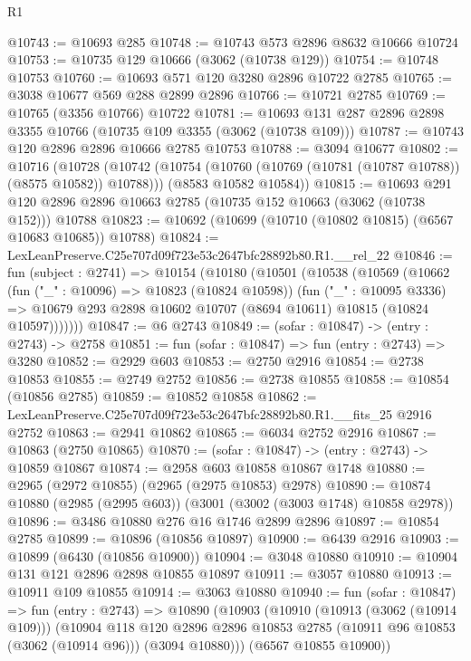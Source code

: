 \begin{lexlean}{R1}
\begin{coremodule}
@10743 := @10693 @285
@10748 := @10743 @573 @2896 @8632 @10666 @10724
@10753 := @10735 @129 @10666 (@3062 (@10738 @129))
@10754 := @10748 @10753
@10760 := @10693 @571 @120 @3280 @2896 @10722 @2785
@10765 := @3038 @10677 @569 @288 @2899 @2896
@10766 := @10721 @2785
@10769 := @10765 (@3356 @10766) @10722
@10781 := @10693 @131 @287 @2896 @2898 @3355 @10766 (@10735 @109 @3355 (@3062 (@10738 @109)))
@10787 := @10743 @120 @2896 @2896 @10666 @2785 @10753
@10788 := @3094 @10677
@10802 := @10716
    (@10728
      (@10742 (@10754 (@10760 (@10769 (@10781 (@10787 @10788)) (@8575 @10582)) @10788)))
      (@8583 @10582 @10584))
@10815 := @10693
    @291
    @120
    @2896
    @2896
    @10663
    @2785
    (@10735 @152 @10663 (@3062 (@10738 @152)))
    @10788
@10823 := @10692 (@10699 (@10710 (@10802 @10815) (@6567 @10683 @10685)) @10788)
@10824 := LexLeanPreserve.C25e707d09f723e53c2647bfc28892b80.R1.__rel_22
@10846 := fun (subject : @2741) =>
  @10154
    (@10180
      (@10501
        (@10538
          (@10569
            (@10662
              (fun ("_" : @10096) => @10823 (@10824 @10598))
              (fun ("_" : @10095 @3336) =>
              @10679 @293 @2898 @10602 @10707 (@8694 @10611) @10815 (@10824 @10597)))))))
@10847 := @6 @2743
@10849 := (sofar : @10847) -> (entry : @2743) -> @2758
@10851 := fun (sofar : @10847) => fun (entry : @2743) => @3280
@10852 := @2929 @603
@10853 := @2750 @2916
@10854 := @2738 @10853
@10855 := @2749 @2752
@10856 := @2738 @10855
@10858 := @10854 (@10856 @2785)
@10859 := @10852 @10858
@10862 := LexLeanPreserve.C25e707d09f723e53c2647bfc28892b80.R1.__fits_25 @2916 @2752
@10863 := @2941 @10862
@10865 := @6034 @2752 @2916
@10867 := @10863 (@2750 @10865)
@10870 := (sofar : @10847) -> (entry : @2743) -> @10859 @10867
@10874 := @2958 @603 @10858 @10867 @1748
@10880 := @2965 (@2972 @10855) (@2965 (@2975 @10853) @2978)
@10890 := @10874 @10880 (@2985 (@2995 @603)) (@3001 (@3002 (@3003 @1748) @10858 @2978))
@10896 := @3486 @10880 @276 @16 @1746 @2899 @2896
@10897 := @10854 @2785
@10899 := @10896 (@10856 @10897)
@10900 := @6439 @2916
@10903 := @10899 (@6430 (@10856 @10900))
@10904 := @3048 @10880
@10910 := @10904 @131 @121 @2896 @2898 @10855 @10897
@10911 := @3057 @10880
@10913 := @10911 @109 @10855
@10914 := @3063 @10880
@10940 := fun (sofar : @10847) =>
  fun (entry : @2743) =>
  @10890
    (@10903
      (@10910
        (@10913 (@3062 (@10914 @109)))
        (@10904
          @118
          @120
          @2896
          @2896
          @10853
          @2785
          (@10911 @96 @10853 (@3062 (@10914 @96)))
          (@3094 @10880)))
      (@6567 @10855 @10900))

\end{coremodule}
\end{lexlean}

